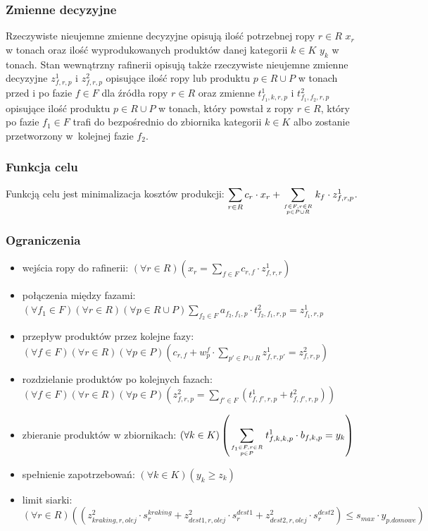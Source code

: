 \documentclass{article}
\begin{document}
\subsubsection{Zmienne decyzyjne}
Rzeczywiste nieujemne zmienne decyzyjne opisują ilość potrzebnej ropy $r \in R$ $x_r$ w tonach oraz ilość wyprodukowanych produktów danej kategorii $k \in K$ $y_k$ w tonach.
Stan wewnątrzny rafinerii opisują także rzeczywiste nieujemne zmienne decyzyjne $z^1_{f, r, p}$ i $z^2_{f, r, p}$ opisujące ilość ropy lub produktu $p \in R \cup P$ w tonach przed i po fazie $f \in F$ dla źródła ropy $r \in R$
oraz zmienne $t^1_{f_1, k, r, p}$ i $t^2_{f_1, f_2, r, p}$ opisujące ilość produktu $p \in R \cup P$ w tonach, który powstał z ropy $r \in R$, który po fazie $f_1 \in F$ trafi do bezpośrednio do zbiornika kategorii $k \in K$ albo zostanie przetworzony w~kolejnej fazie $f_2$.

\subsubsection{Funkcja celu}
Funkcją celu jest minimalizacja kosztów produkcji: $\displaystyle \sum_{r \in R} c_r \cdot x_r + \sum_{f \in F, r \in R \atop p \in P \cup R} k_f \cdot z^1_{f, r, p}$.

\subsubsection{Ograniczenia}
\begin{itemize}
    \item wejścia ropy do rafinerii: $\displaystyle \left(\forall r \in R \right) \left(x_r = \sum_{f \in F} c_{r,f} \cdot z^1_{f, r, r} \right)$
    \item połączenia między fazami: $\displaystyle \left(\forall f_1 \in F \right)\left(\forall r \in R \right)\left(\forall p \in R \cup P \right) \sum_{f_2 \in F} a_{f_2,f_1,p} \cdot t^2_{f_2, f_1, r, p} = z^1_{f_1, r, p}$
    \item przepływ produktów przez kolejne fazy: $\displaystyle \left(\forall f \in F \right)\left(\forall r \in R \right)\left(\forall p \in P \right) \left(c_{r, f} + w_p^f \cdot \sum_{p' \in P \cup R} z^1_{f, r, p'} = z^2_{f, r, p} \right)$
    \item rozdzielanie produktów po kolejnych fazach: $\displaystyle \left(\forall f \in F \right)\left(\forall r \in R \right)\left(\forall p \in P \right) \left(z^2_{f, r, p} = \sum_{f' \in F}(t^1_{f, f', r, p} + t^2_{f, f', r, p}) \right)$
    \item zbieranie produktów w zbiornikach: $\displaystyle \left(\forall k \in K \right) \left(\sum_{f_1 \in F, r \in R \atop p \in P} t^1_{f, k, k, p} \cdot b_{f,k,p} = y_k \right)$
    \item spełnienie zapotrzebowań: $\displaystyle \left(\forall k \in K \right) \left(y_k \geq z_k \right)$
    \item limit siarki: $\displaystyle \left(\forall r \in R \right) \left((z^2_{kraking, r, olej} \cdot s_r^{kraking} + z^2_{dest1, r, olej} \cdot s_r^{dest1} + z^2_{dest2, r, olej} \cdot s_r^{dest2})  \leq s_{max} \cdot y_{p. domowe} \right)$
\end{itemize}
\end{document}
